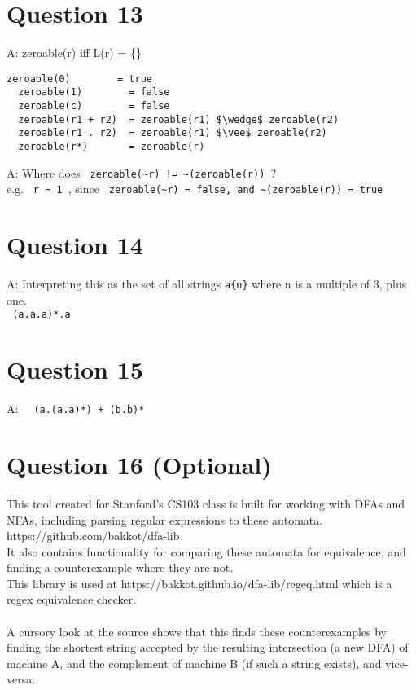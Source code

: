 \documentclass[english]{scrartcl}
\begin{document}
\section*{Question 13}
A:
zeroable(r) iff L(r) = \{\}

\begin{Verbatim}[mathescape,commandchars=\\\{\}]
  zeroable(0)        = true
  zeroable(1)        = false
  zeroable(c)        = false
  zeroable(r1 + r2)  = zeroable(r1) $\wedge$ zeroable(r2)
  zeroable(r1 . r2)  = zeroable(r1) $\vee$ zeroable(r2)
  zeroable(r*)       = zeroable(r)
\end{Verbatim}


A: Where does \verb| zeroable(~r) != ~(zeroable(r)) |? \\
e.g. \verb| r = 1 |, since \verb| zeroable(~r) = false, and ~(zeroable(r)) = true|


\section*{Question 14}
A: Interpreting this as the set of all strings \verb~a{n}~ where n is a multiple of 3, plus one.\\
\verb~ (a.a.a)*.a ~

\section*{Question 15}
A: \verb~  (a.(a.a)*) + (b.b)*  ~

\section*{Question 16 (Optional)}
This tool created for Stanford's CS103 class is built for working with DFAs and NFAs, including parsing regular expressions to these automata. \\
https://github.com/bakkot/dfa-lib \\
It also contains functionality for comparing these automata for equivalence, and finding a counterexample where they are not. \\
This library is used at https://bakkot.github.io/dfa-lib/regeq.html which is a regex equivalence checker. \\
\\
A cursory look at the source shows that this finds these counterexamples by finding the shortest string accepted by the resulting intersection (a new DFA) of machine A, and the complement of machine B (if such a string exists), and vice-versa.
\end{document}
